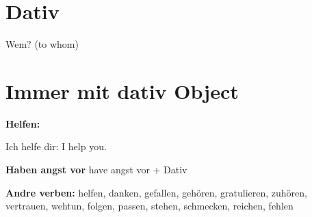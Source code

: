 \section{Dativ}

Wem? (to whom)




\section*{Immer mit dativ Object}

\textbf{Helfen:}


Ich helfe dir: I help you.


\textbf{Haben angst vor}
have angst vor + Dativ


\textbf{Andre verben: }
helfen, danken, gefallen, gehören,
gratulieren, zuhören, vertrauen, wehtun, folgen, passen, stehen,
schmecken, reichen, fehlen


